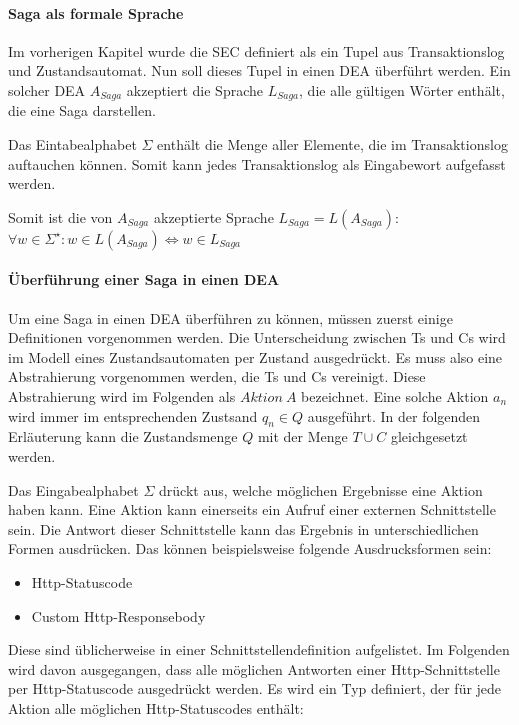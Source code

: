 \paragraph{Saga als formale Sprache}
Im vorherigen Kapitel wurde die SEC definiert als ein Tupel aus Transaktionslog und Zustandsautomat. Nun soll dieses Tupel in einen DEA überführt werden. Ein solcher DEA $A_{Saga}$ akzeptiert die Sprache $L_{Saga}$, die alle gültigen Wörter enthält, die eine Saga darstellen.

Das Eintabealphabet $\Sigma$ enthält die Menge aller Elemente, die im Transaktionslog auftauchen können. Somit kann jedes Transaktionslog als Eingabewort aufgefasst werden. 

Somit ist die von $A_{Saga}$ akzeptierte Sprache $L_{Saga} = L(A_{Saga})$: \\

$\forall w \in \Sigma^{\star}: w \in L(A_{Saga}) \iff w \in L_{Saga}$
\paragraph{Überführung einer Saga in einen DEA}
Um eine Saga in einen DEA überführen zu können, müssen zuerst einige Definitionen vorgenommen werden. Die Unterscheidung zwischen Ts und Cs wird im Modell eines Zustandsautomaten per Zustand ausgedrückt. Es muss also eine Abstrahierung vorgenommen werden, die Ts und Cs vereinigt. Diese Abstrahierung wird im Folgenden als $Aktion\ A$ bezeichnet. Eine solche Aktion $a_n$ wird immer im entsprechenden Zustsand $q_n \in Q$ ausgeführt. In der folgenden Erläuterung kann die Zustandsmenge $Q$ mit der Menge $T \cup C$ gleichgesetzt werden.

Das Eingabealphabet $\Sigma$ drückt aus, welche möglichen Ergebnisse eine Aktion haben kann. Eine Aktion kann einerseits ein Aufruf einer externen Schnittstelle sein. Die Antwort dieser Schnittstelle kann das Ergebnis in unterschiedlichen Formen ausdrücken. Das können beispielsweise folgende Ausdrucksformen sein:
\begin{itemize}
	\item Http-Statuscode
	\item Custom Http-Responsebody
\end{itemize}
Diese sind üblicherweise in einer Schnittstellendefinition aufgelistet. Im Folgenden wird davon ausgegangen, dass alle möglichen Antworten einer Http-Schnittstelle per Http-Statuscode ausgedrückt werden. Es wird ein Typ definiert, der für jede Aktion alle möglichen Http-Statuscodes enthält: 


